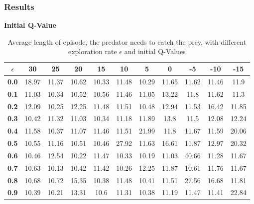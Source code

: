 \documentclass[11pt]{article}
\begin{document}
\subsubsection{Results}
\begin{center}
\begin{table*}[ht]
{\small
\hfill{}
\begin{center}
\textbf{Initial Q-Value}\\
\end{center}
\begin{tabular}{c|c|c|c|c|c|c|c|c|c|c}
\textbf{$\epsilon$} & \textbf{30} & \textbf{25} & \textbf{20} & \textbf{15} & \textbf{10} & \textbf{5} & \textbf{0} & \textbf{-5} & \textbf{-10}& \textbf{-15}\\
	\hline
\textbf{0.0} & 18.97 & 11.37 & 10.62 & 10.33 & 11.48 & 10.29 & 11.65 & 11.62 & 11.46 & 11.9\\
\textbf{0.1} & 11.03 & 10.34 & 10.52 & 10.56 & 11.46 & 11.05 & 13.22 & 11.8 & 11.62 & 11.3\\
\textbf{0.2} & 12.09 & 10.25 & 12.25 & 11.48 & 11.51 & 10.48 & 12.94 & 11.53 & 16.42 & 11.85\\
\textbf{0.3} & 10.42 & 11.32 & 11.03 & 10.34 & 11.18 & 11.89 & 13.8 & 11.5 & 12.08 & 12.24\\
\textbf{0.4} & 11.58 & 10.37 & 11.07 & 11.46 & 11.51 & 21.99 & 11.8 & 11.67 & 11.59 & 20.06\\
\textbf{0.5} & 10.55 & 11.16 & 10.51 & 10.46 & 27.92 & 11.63 & 16.61 & 11.87 & 12.97 & 20.32\\
\textbf{0.6} & 10.46 & 12.54 & 10.22 & 11.47 & 10.33 & 10.19 & 11.03 & 40.66 & 11.28 & 11.67\\
\textbf{0.7} & 10.63 & 10.13 & 10.42 & 11.42 & 10.26 & 12.25 & 11.87 & 10.61 & 11.76 & 11.67\\
\textbf{0.8} & 10.68 & 10.72 & 15.35 & 10.38 & 11.48 & 10.41 & 11.51 & 27.56 & 16.68 & 11.81\\
\textbf{0.9} & 10.39 & 10.21 & 13.31 & 10.6 & 11.31 & 10.38 & 11.19 & 11.47 & 11.41 & 22.84\\
\end{tabular}}
\hfill{}
\caption{Average length of episode, the predator needs to catch the prey, with different exploration rate $\epsilon$ and initial Q-Values}
\label{table:task1}
\end{table*}
\end{center}






\end{document}
